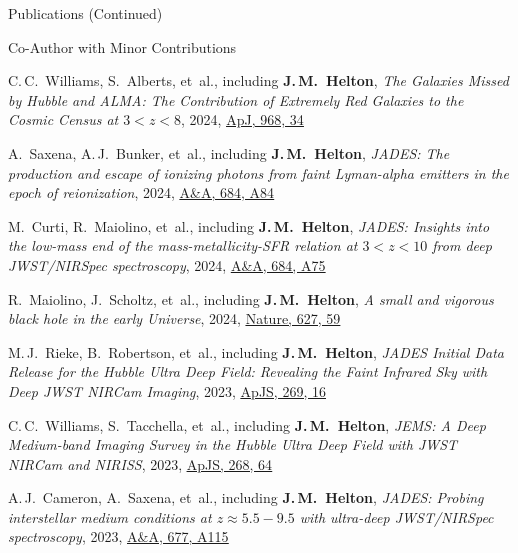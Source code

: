 \documentclass{JMH_CV}
\begin{document}
\begin{rSection}{Publications (Continued)}
\begin{rSubsection}{Co-Author with Minor Contributions}{}{}{}
\begin{etaremune}
    \item C.\,C.~Williams, S.~Alberts, et~al., including \textbf{J.\,M.~Helton}, \textit{The Galaxies Missed by Hubble and ALMA: The Contribution of Extremely Red Galaxies to the Cosmic Census at $\mathit{3 < z < 8}$}, 2024, \href{https://www.scixplorer.org/abs/2024ApJ...968...34W/abstract}{\ul{ApJ, 968, 34}}

    \item A.~Saxena, A.\,J.~Bunker, et~al., including \textbf{J.\,M.~Helton}, \textit{JADES: The \mbox{production} and escape of ionizing photons from faint Lyman-alpha emitters in the epoch of \mbox{reionization}}, 2024, \href{https://www.scixplorer.org/abs/2024A&A...684A..84S/abstract}{\ul{A\&A, 684, A84}}

    \item M.~Curti, R.~Maiolino, et~al., including \textbf{J.\,M.~Helton}, \textit{JADES: Insights into the low-mass end of the mass-metallicity-SFR relation at $\mathit{3 < z < 10}$ from deep JWST/NIRSpec spectroscopy}, 2024, \href{https://www.scixplorer.org/abs/2024A&A...684A..75C/abstract}{\ul{A\&A, 684, A75}}

    \item R.~Maiolino, J.~Scholtz, et~al., including \textbf{J.\,M.~Helton}, \textit{A small and vigorous black hole in the early Universe}, 2024, \href{https://www.scixplorer.org/abs/2024Natur.627...59M/abstract}{\ul{Nature, 627, 59}}

    \item M.\,J.~Rieke, B.~Robertson, et~al., including \textbf{J.\,M.~Helton}, \textit{JADES Initial Data Release for the Hubble Ultra Deep Field: Revealing the Faint Infrared Sky with Deep JWST NIRCam Imaging}, 2023, \href{https://www.scixplorer.org/abs/2023ApJS..269...16R/abstract}{\ul{ApJS, 269, 16}}

    \item C.\,C.~Williams, S.~Tacchella, et~al., including \textbf{J.\,M.~Helton}, \textit{JEMS: A Deep Medium-band Imaging Survey in the Hubble Ultra Deep Field with JWST NIRCam and NIRISS}, 2023, \href{https://www.scixplorer.org/abs/2023ApJS..268...64W/abstract}{\ul{ApJS, 268, 64}}

    \item A.\,J.~Cameron, A.~Saxena, et~al., including \textbf{J.\,M.~Helton}, \textit{JADES: Probing \mbox{interstellar} medium conditions at $\mathit{z \approx 5.5-9.5}$ with ultra-deep JWST/NIRSpec spectroscopy}, 2023, \href{https://www.scixplorer.org/abs/2023A&A...677A.115C/abstract}{\ul{A\&A, 677, A115}}


\end{etaremune}
\end{rSubsection}
\end{rSection}
\end{document}
